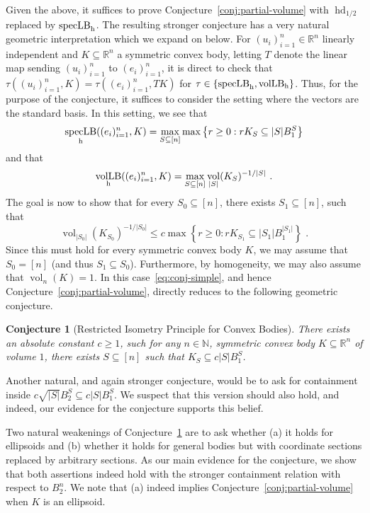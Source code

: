 \documentclass[12pt]{article}
\newtheorem{conjecture}[theorem]{Conjecture}
\newcommand{\R}{{\mathbb{R}}}
\newcommand{\N}{{\mathbb{N}}}
\newcommand{\set}[1]{\left\{ #1 \right\}}
\DeclareMathOperator{\vollb}{volLB}
\DeclareMathOperator{\hd}{hd}
\DeclareMathOperator{\vol}{vol}
\DeclareMathOperator{\speclb}{specLB}
\begin{document}
Given the above, it suffices to prove Conjecture~\ref{conj:partial-volume} with
$\hd_{1/2}$ replaced by $\speclb_{\rm h}$. The resulting stronger conjecture has a
very natural geometric interpretation which we expand on below. For
$(u_i)_{i=1}^n \in \R^n$ linearly independent and $K \subseteq \R^n$ a symmetric
convex body, letting $T$ denote the linear map sending $(u_i)_{i=1}^n$ to
$(e_i)_{i=1}^n$, it is direct to check that $\tau((u_i)_{i=1}^n,K) =
\tau((e_i)_{i=1}^n,TK)$ for $\tau \in \set{\speclb_{\rm h},\vollb_{\rm h}}$.
Thus, for the purpose of the conjecture, it suffices to consider the setting
where the vectors are the standard basis. In this setting, we see that
\[
\speclb_{\rm h}((e_i)_{i=1}^n,K) = \max_{S \subseteq [n]} \max \set{r \geq
0: r K_S \subseteq |S| B_1^S} 
\]
and that 
\[
\vollb_{\rm h}((e_i)_{i=1}^n,K) = \max_{S \subseteq [n]}
\vol_{|S|}(K_S)^{-1/|S|} \text{ .} 
\]
The goal is now to show that for every $S_0 \subseteq [n]$, there exists $S_1
\subseteq [n]$, such that 
\begin{equation}
\label{eq:conj-simple}
\vol_{|S_0|}(K_{S_0})^{-1/|S_0|} \leq c \max \set{r \geq 0: r K_{S_1} \subseteq
|S_1| B_1^{|S_1|}} \text{ .}
\end{equation}
Since this must hold for every symmetric convex body $K$, we may assume that
$S_0 = [n]$ (and thus $S_1 \subseteq S_0$). Furthermore, by homogeneity, we may
also assume that $\vol_n(K)=1$. In this case~\eqref{eq:conj-simple}, and hence
Conjecture~\ref{conj:partial-volume}, directly reduces to the following
geometric conjecture.

\begin{conjecture}[Restricted Isometry Principle for Convex Bodies]
\label{conj:conv-restr-iso} There exists an absolute constant $c \geq 1$, such
for any $n \in \N$, symmetric convex body $K \subseteq \R^n$ of volume $1$,
there exists $S \subseteq [n]$ such that $K_S \subseteq c |S| B_1^S$.
\end{conjecture}

Another natural, and again stronger conjecture, would be to ask for containment
inside $c \sqrt{|S|} B_2^S \subseteq c |S| B_1^S$. We suspect that this version
should also hold, and indeed, our evidence for the conjecture supports this
belief. 

Two natural weakenings of Conjecture~\ref{conj:conv-restr-iso} are to ask
whether (a) it holds for ellipsoids and (b) whether it holds for general bodies
but with coordinate sections replaced by arbitrary sections. As our main
evidence for the conjecture, we show that both assertions indeed hold with the
stronger containment relation with respect to $B_2^n$. We note that (a) indeed
implies Conjecture~\ref{conj:partial-volume} when $K$ is an ellipsoid.  
\end{document}
